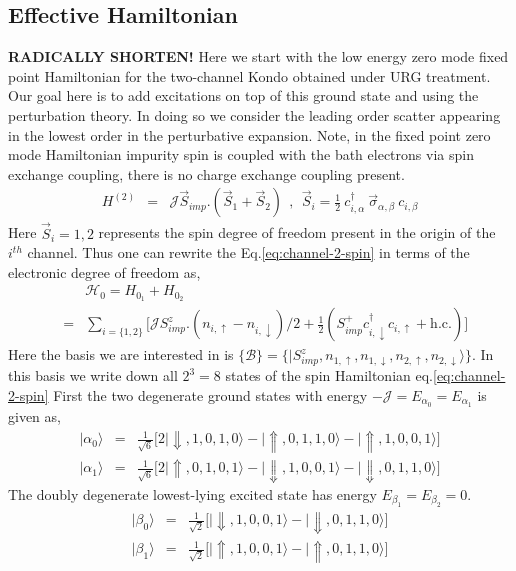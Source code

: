 \documentclass[reprint,prb,superscriptaddress]{revtex4-2}
\begin{document}
\subsection{Effective Hamiltonian}
\textbf{RADICALLY SHORTEN!}
\noindent Here we start with the low energy zero mode fixed point Hamiltonian for the two-channel Kondo obtained under URG treatment. Our goal here is to add excitations on top of this ground state and using the perturbation theory. In doing so we consider the leading order scatter appearing in the lowest order in the perturbative expansion. Note, in the fixed point zero mode Hamiltonian impurity spin is coupled with the bath electrons via spin exchange coupling, there is no charge exchange coupling present. 
\begin{eqnarray}
H^{(2)}&=& {\mathcal{J}} \vec{S}_{imp}.(\vec{S}_1+\vec{S}_2)~~,~~\vec{S}_i =  \frac{1}{2}~ c_{i,\alpha}^{\dagger}~ \vec{\sigma}_{\alpha,\beta}~ c_{i,\beta}
\label{eq:channel-2-spin}
\end{eqnarray}
Here $\vec{S}_i=1,2$ represents the spin degree of freedom present in the origin of the $i^{th}$ channel. Thus one can rewrite the Eq.\eqref{eq:channel-2-spin} in terms of the electronic degree of freedom as,
\begin{eqnarray}
&&\mathcal{H}_0= H_{0_1}+H_{0_2} \nonumber\\
&=&\sum_{i=\{1,2\}}\bigg[ {\mathcal{J}} S^z_{imp}. (n_{i,\uparrow}-n_{i,\downarrow})/2 + \frac{1}{2}  ( S_{imp}^{+} c^{\dagger}_{i,\downarrow} c_{i,\uparrow} + \textrm{h.c.}  )\nonumber \bigg]
\end{eqnarray}
Here the basis we are interested in is $\{\mathcal{B}\}=\{|S^z_{imp},n_{1,\uparrow},n_{1,\downarrow},n_{2,\uparrow},n_{2,\downarrow}\rangle \}$. In this basis we write down all $2^3=8$ states of the spin Hamiltonian eq.\eqref{eq:channel-2-spin}
First the two degenerate ground states with energy $-{\mathcal{J}}= E_{\alpha_0}= E_{\alpha_1}$ is given as,
\begin{eqnarray}
|\alpha_0\rangle &=& \frac{1}{\sqrt{6}} \bigg[2|\Downarrow,1,0,1,0\rangle-|\Uparrow,0,1,1,0\rangle-|\Uparrow,1,0,0,1\rangle\bigg] \nonumber\\
|\alpha_1\rangle &=& \frac{1}{\sqrt{6}} \bigg[2|\Uparrow,0,1,0,1\rangle-|\Downarrow,1,0,0,1\rangle-|\Downarrow,0,1,1,0\rangle\bigg] \nonumber
\end{eqnarray}
The doubly degenerate lowest-lying excited state has energy $E_{\beta_1}=E_{\beta_2}=0$.
\begin{eqnarray}
|\beta_0\rangle &=& \frac{1}{\sqrt{2}}\bigg[|\Downarrow,1,0,0,1\rangle-|\Downarrow,0,1,1,0\rangle \bigg] \nonumber\\
|\beta_1\rangle &=& \frac{1}{\sqrt{2}} \bigg[ |\Uparrow,1,0,0,1\rangle-|\Uparrow,0,1,1,0\rangle \bigg]
\end{eqnarray}
\end{document}
